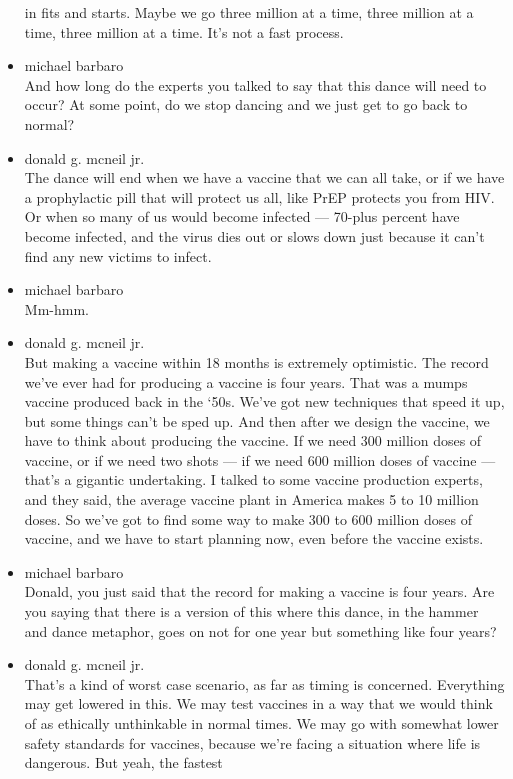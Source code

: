 \begin{itemize}
  in fits and starts. Maybe we go three million at a time, three million
  at a time, three million at a time. It's not a fast process.
\item
  michael barbaro\\
  And how long do the experts you talked to say that this dance will
  need to occur? At some point, do we stop dancing and we just get to go
  back to normal?
\item
  donald g. mcneil jr.\\
  The dance will end when we have a vaccine that we can all take, or if
  we have a prophylactic pill that will protect us all, like PrEP
  protects you from HIV. Or when so many of us would become infected ---
  70-plus percent have become infected, and the virus dies out or slows
  down just because it can't find any new victims to infect.
\item
  michael barbaro\\
  Mm-hmm.
\item
  donald g. mcneil jr.\\
  But making a vaccine within 18 months is extremely optimistic. The
  record we've ever had for producing a vaccine is four years. That was
  a mumps vaccine produced back in the `50s. We've got new techniques
  that speed it up, but some things can't be sped up. And then after we
  design the vaccine, we have to think about producing the vaccine. If
  we need 300 million doses of vaccine, or if we need two shots --- if
  we need 600 million doses of vaccine --- that's a gigantic
  undertaking. I talked to some vaccine production experts, and they
  said, the average vaccine plant in America makes 5 to 10 million
  doses. So we've got to find some way to make 300 to 600 million doses
  of vaccine, and we have to start planning now, even before the vaccine
  exists.
\item
  michael barbaro\\
  Donald, you just said that the record for making a vaccine is four
  years. Are you saying that there is a version of this where this
  dance, in the hammer and dance metaphor, goes on not for one year but
  something like four years?
\item
  donald g. mcneil jr.\\
  That's a kind of worst case scenario, as far as timing is concerned.
  Everything may get lowered in this. We may test vaccines in a way that
  we would think of as ethically unthinkable in normal times. We may go
  with somewhat lower safety standards for vaccines, because we're
  facing a situation where life is dangerous. But yeah, the fastest

\end{itemize}
